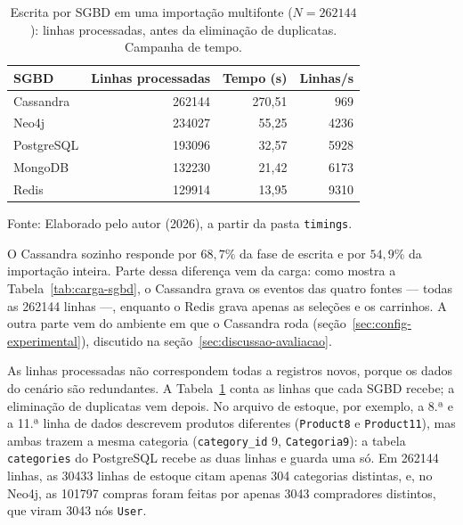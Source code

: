 \begin{table}[H]
  \caption{Escrita por SGBD em uma importação multifonte ($N = \num{262144}$): linhas processadas, antes da eliminação de duplicatas. Campanha de tempo.}
  \label{tab:escrita-sgbd}
  \centering
  \begin{tabular}{l r r r}
    \toprule
    \textbf{SGBD} & \textbf{Linhas processadas} & \textbf{Tempo (s)} & \textbf{Linhas/s} \\
    \midrule
    Cassandra  & \num{262144} & 270{,}51 &   $969$ \\
    Neo4j      & \num{234027} &  55{,}25 & \num{4236} \\
    PostgreSQL & \num{193096} &  32{,}57 & \num{5928} \\
    MongoDB    & \num{132230} &  21{,}42 & \num{6173} \\
    Redis      & \num{129914} &  13{,}95 & \num{9310} \\
    \bottomrule
  \end{tabular}
  \par\vspace{4pt}
  {\footnotesize Fonte: Elaborado pelo autor (2026), a partir da pasta \texttt{timings}.}
\end{table}

O Cassandra sozinho responde por $68{,}7\%$ da fase de escrita e por $54{,}9\%$ da
importação inteira. Parte dessa diferença vem da carga: como mostra a
Tabela~\ref{tab:carga-sgbd}, o Cassandra grava os eventos das quatro fontes --- todas as
\num{262144} linhas ---, enquanto o Redis grava apenas as seleções e os carrinhos. A outra
parte vem do ambiente em que o Cassandra roda (seção~\ref{sec:config-experimental}), discutido
na seção~\ref{sec:discussao-avaliacao}.

As linhas processadas não correspondem todas a registros novos, porque os dados do cenário
são redundantes. A Tabela~\ref{tab:escrita-sgbd} conta as linhas que cada SGBD recebe; a
eliminação de duplicatas vem depois. No arquivo de estoque, por exemplo, a 8.ª e a 11.ª linha de dados
descrevem produtos diferentes (\texttt{Product8} e \texttt{Product11}), mas ambas trazem a
mesma categoria (\texttt{category\_id} 9, \texttt{Categoria9}): a tabela
\texttt{categories} do PostgreSQL recebe as duas linhas e guarda uma só. Em
\num{262144} linhas, as \num{30433} linhas de estoque citam apenas 304 categorias distintas,
e, no Neo4j, as \num{101797} compras foram feitas por apenas \num{3043} compradores
distintos, que viram \num{3043} nós \texttt{User}.

